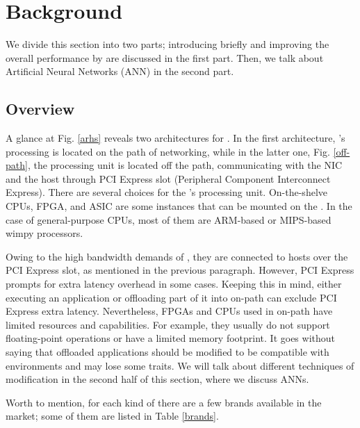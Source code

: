 \section{Background}
\label{sec-back}
We divide this section into two parts; introducing \smartnics briefly and improving the overall performance by \smartnics are discussed in the first part.  Then, we talk about Artificial Neural Networks (ANN) in the second part.

\subsection{\smartnics Overview}
A glance at Fig. \ref{arhs} reveals two architectures for \smartnics. In the first architecture, \smartnic's processing is located on the path of networking, while in the latter one, Fig. \ref{off-path}, the processing unit is located off the path, communicating with the NIC and the host through PCI Express slot (Peripheral Component Interconnect Express). There are several choices for the \smartnic's processing unit. On-the-shelve CPUs, FPGA, and ASIC are some instances that can be mounted on the \smartnics. In the case of general-purpose CPUs, most of them are ARM-based or MIPS-based wimpy processors.

\par
Owing to the high bandwidth demands of \smartnics, they are connected to hosts over the PCI Express slot, as mentioned in the previous paragraph. However,  PCI Express prompts for extra latency overhead in some cases. Keeping this in mind, either executing an application or offloading part of it into on-path \smartnics can exclude PCI Express extra latency. Nevertheless, FPGAs and CPUs used in on-path \smartnics have limited resources and capabilities. For example, they usually do not support floating-point operations or have a limited memory footprint. It goes without saying that offloaded applications should be modified to be compatible with \smartnics environments and may lose some traits. We will talk about different techniques of modification in the second half of this section, where we discuss ANNs.
\par
Worth to mention, for each kind of \smartnics there are a few brands available in the market; some of them are listed in Table \ref{brands}.

